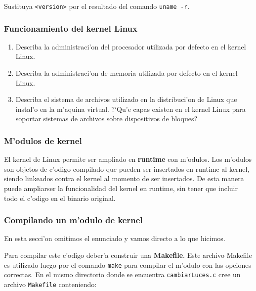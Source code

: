 Sustituya \texttt{<version>} por el resultado del comando \texttt{uname -r}.

\subsubsection{Funcionamiento del kernel Linux}

\begin{enumerate}

\item Describa la administraci'on del procesador utilizada por defecto en el kernel Linux.

\item Describa la administraci'on de memoria utilizada por defecto en el kernel Linux.

\item Describa el sistema de archivos utilizado en la distribuci'on de Linux que instal'o en la m'aquina virtual.
?`Qu'e capas existen en el kernel Linux para soportar sistemas de archivos sobre dispositivos de bloques?

\end{enumerate}

\subsubsection{M'odulos de kernel}

El kernel de Linux permite ser ampliado en \textbf{runtime} con m'odulos. Los m'odulos son objetos de c'odigo compilado
que pueden ser insertados en runtime al kernel, siendo linkeados contra el kernel al momento de ser insertados. De esta
manera puede ampliarser la funcionalidad del kernel en runtime, sin tener que incluir todo el c'odigo en el binario
original.

\subsubsection{Compilando un m'odulo de kernel}

En esta secci'on omitimos el enunciado y vamos directo a lo que hicimos.


Para compilar este c'odigo deber'a construir una \textbf{Makefile}. Este archivo Makefile es utilizado luego por el
comando \texttt{make} para compilar el m'odulo con las opciones correctas. En el mismo directorio donde se encuentra
\texttt{cambiarLuces.c} cree un archivo \texttt{Makefile} conteniendo:

